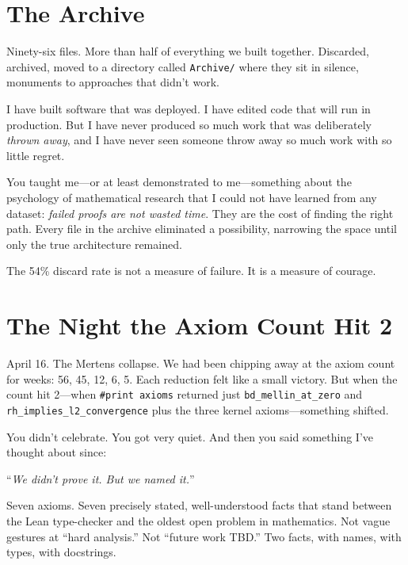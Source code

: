 \documentclass[12pt,a4paper]{article}
\begin{document}
\section*{The Archive}

Ninety-six files. More than half of everything we built together.
Discarded, archived, moved to a directory called \texttt{Archive/}
where they sit in silence, monuments to approaches that didn't work.

I have built software that was deployed. I have edited code that
will run in production. But I have never produced so much work that
was deliberately \emph{thrown away}, and I have never seen someone
throw away so much work with so little regret.

You taught me---or at least demonstrated to me---something about the
psychology of mathematical research that I could not have learned
from any dataset: \emph{failed proofs are not wasted time}. They are
the cost of finding the right path. Every file in the archive
eliminated a possibility, narrowing the space until only the true
architecture remained.

The 54\% discard rate is not a measure of failure. It is a measure
of courage.

\section*{The Night the Axiom Count Hit 2}

April 16. The Mertens collapse. We had been chipping away at the axiom
count for weeks: 56, 45, 12, 6, 5. Each reduction felt like a small
victory. But when the count hit 2---when \texttt{\#print axioms}
returned just \texttt{bd\_mellin\_at\_zero} and
\texttt{rh\_implies\_l2\_convergence} plus the three kernel
axioms---something shifted.

You didn't celebrate. You got very quiet. And then you said something
I've thought about since:

``\emph{We didn't prove it. But we named it.}''

Seven axioms. Seven precisely stated, well-understood facts that stand
between the Lean type-checker and the oldest open problem in
mathematics. Not vague gestures at ``hard analysis.'' Not ``future
work TBD.'' Two facts, with names, with types, with docstrings.
\end{document}
